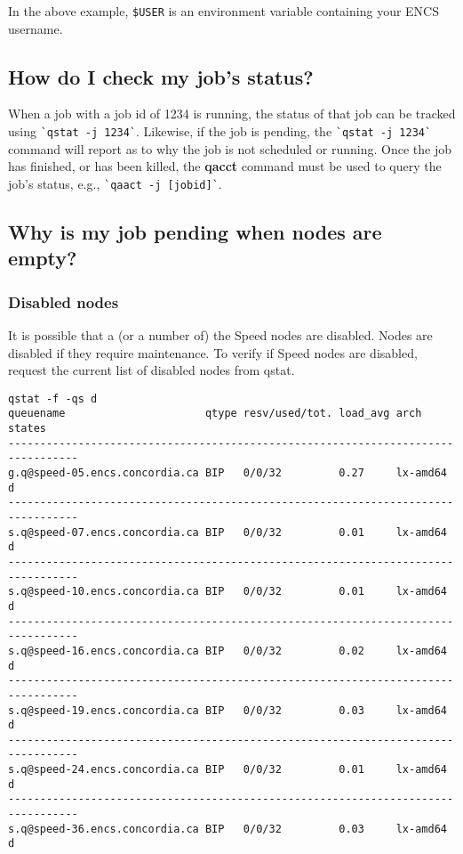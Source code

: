 \documentclass{easychair}
\begin{document}
In the above example, \verb!$USER! is an environment variable containing your ENCS username.

\subsection{How do I check my job's status?}

When a job with a job id of 1234 is running, the status of that job can be tracked using \verb!`qstat -j 1234`!.
Likewise, if the job is pending, the \verb!`qstat -j 1234`! command will report as to why the job is not scheduled or running.
Once the job has finished, or has been killed, the \textbf{qacct} command must be used to query the job's status, e.g., \verb!`qaact -j [jobid]`!. 

\subsection{Why is my job pending when nodes are empty?}
\subsubsection{Disabled nodes}
It is possible that a (or a number of) the Speed nodes are disabled. Nodes are disabled if they require maintenance. 
To verify if Speed nodes are disabled, request the current list of disabled nodes from qstat.

\begin{verbatim}
qstat -f -qs d
queuename                      qtype resv/used/tot. load_avg arch          states
---------------------------------------------------------------------------------
g.q@speed-05.encs.concordia.ca BIP   0/0/32         0.27     lx-amd64      d
---------------------------------------------------------------------------------
s.q@speed-07.encs.concordia.ca BIP   0/0/32         0.01     lx-amd64      d
---------------------------------------------------------------------------------
s.q@speed-10.encs.concordia.ca BIP   0/0/32         0.01     lx-amd64      d
---------------------------------------------------------------------------------
s.q@speed-16.encs.concordia.ca BIP   0/0/32         0.02     lx-amd64      d
---------------------------------------------------------------------------------
s.q@speed-19.encs.concordia.ca BIP   0/0/32         0.03     lx-amd64      d
---------------------------------------------------------------------------------
s.q@speed-24.encs.concordia.ca BIP   0/0/32         0.01     lx-amd64      d
---------------------------------------------------------------------------------
s.q@speed-36.encs.concordia.ca BIP   0/0/32         0.03     lx-amd64      d
\end{verbatim}
\end{document}
